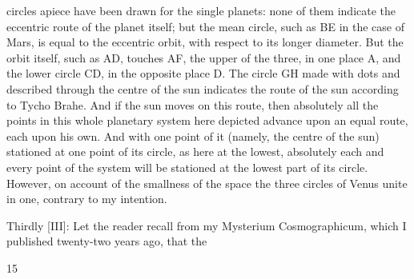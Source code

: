 \documentclass{article}
\begin{document}
circles apiece have been drawn for the single planets: none of them
indicate the eccentric route of the planet itself; but the mean circle, such
as BE in the case of Mars, is equal to the eccentric orbit, with respect to
its longer diameter. But the orbit itself, such as AD, touches AF, the
upper of the three, in one place A, and the lower circle CD, in the
opposite place D. The circle GH made with dots and described through
the centre of the sun indicates the route of the sun according to Tycho
Brahe. And if the sun moves on this route, then absolutely all the points
in this whole planetary system here depicted advance upon an equal
route, each upon his own. And with one point of it (namely, the centre of
the sun) stationed at one point of its circle, as here at the lowest,
absolutely each and every point of the system will be stationed at the
lowest part of its circle. However, on account of the smallness of the
space the three circles of Venus unite in one, contrary to my intention.

Thirdly [III]: Let the reader recall from my Mysterium
Cosmographicum, which I published twenty-two years ago, that the


15
\end{document}
